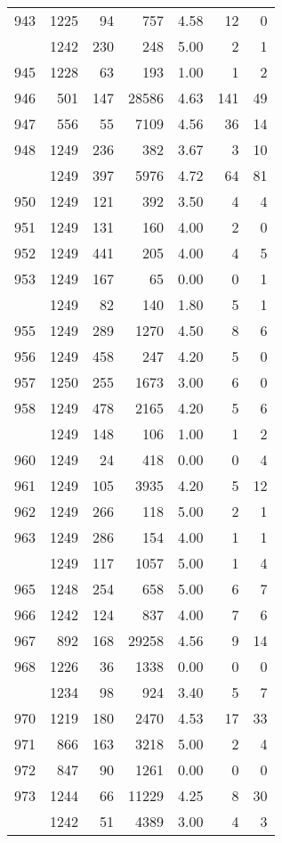\documentclass[
]{article}
\begin{document}
\begin{table}
\begin{tabular}[t]{lrrrrrr}
943 & 1225 & 94 & 757 & 4.58 & 12 & 0\\
\addlinespace
944 & 1242 & 230 & 248 & 5.00 & 2 & 1\\
945 & 1228 & 63 & 193 & 1.00 & 1 & 2\\
946 & 501 & 147 & 28586 & 4.63 & 141 & 49\\
947 & 556 & 55 & 7109 & 4.56 & 36 & 14\\
948 & 1249 & 236 & 382 & 3.67 & 3 & 10\\
\addlinespace
949 & 1249 & 397 & 5976 & 4.72 & 64 & 81\\
950 & 1249 & 121 & 392 & 3.50 & 4 & 4\\
951 & 1249 & 131 & 160 & 4.00 & 2 & 0\\
952 & 1249 & 441 & 205 & 4.00 & 4 & 5\\
953 & 1249 & 167 & 65 & 0.00 & 0 & 1\\
\addlinespace
954 & 1249 & 82 & 140 & 1.80 & 5 & 1\\
955 & 1249 & 289 & 1270 & 4.50 & 8 & 6\\
956 & 1249 & 458 & 247 & 4.20 & 5 & 0\\
957 & 1250 & 255 & 1673 & 3.00 & 6 & 0\\
958 & 1249 & 478 & 2165 & 4.20 & 5 & 6\\
\addlinespace
959 & 1249 & 148 & 106 & 1.00 & 1 & 2\\
960 & 1249 & 24 & 418 & 0.00 & 0 & 4\\
961 & 1249 & 105 & 3935 & 4.20 & 5 & 12\\
962 & 1249 & 266 & 118 & 5.00 & 2 & 1\\
963 & 1249 & 286 & 154 & 4.00 & 1 & 1\\
\addlinespace
964 & 1249 & 117 & 1057 & 5.00 & 1 & 4\\
965 & 1248 & 254 & 658 & 5.00 & 6 & 7\\
966 & 1242 & 124 & 837 & 4.00 & 7 & 6\\
967 & 892 & 168 & 29258 & 4.56 & 9 & 14\\
968 & 1226 & 36 & 1338 & 0.00 & 0 & 0\\
\addlinespace
969 & 1234 & 98 & 924 & 3.40 & 5 & 7\\
970 & 1219 & 180 & 2470 & 4.53 & 17 & 33\\
971 & 866 & 163 & 3218 & 5.00 & 2 & 4\\
972 & 847 & 90 & 1261 & 0.00 & 0 & 0\\
973 & 1244 & 66 & 11229 & 4.25 & 8 & 30\\
\addlinespace
974 & 1242 & 51 & 4389 & 3.00 & 4 & 3\\

\end{tabular}
\end{table}
\end{document}
